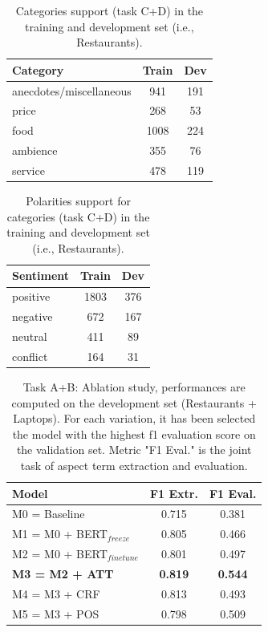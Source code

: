 \documentclass[11pt,a4paper]{article}
\begin{document}
	\begin{table}[H]
		\centering
		\begin{tabular}{@{}lcc@{}}
			\toprule
			\textbf{Category}         & Train     & Dev \\ \midrule
			anecdotes/miscellaneous   & 941       & 191     \\
			price                     & 268       & 53      \\
			food                      & 1008      & 224     \\
			ambience                  & 355       & 76      \\
			service                   & 478       & 119     \\ \bottomrule
		\end{tabular}
		\caption{Categories support (task C+D) in the training and development set
			(i.e., Restaurants).}
		\label{tab:cd_categories_support}
	\end{table}
	
	\begin{table}[H]
		\centering
		\begin{tabular}{@{}lcc@{}}
			\toprule
			\textbf{Sentiment} & Train & Dev \\ \midrule
			positive           & 1803  & 376 \\
			negative           & 672   & 167 \\
			neutral            & 411   & 89  \\
			conflict           & 164   & 31  \\ \bottomrule
		\end{tabular}
		\caption{Polarities support for categories (task C+D) in the training and development set (i.e., Restaurants).}
		\label{tab:cd_polarities_support}
	\end{table}
	
	
	\begin{table}[H]
		\centering
		\begin{tabular}{@{}lcc@{}}
			\toprule
			\textbf{Model}         & F1 Extr.       & F1 Eval.       \\ \midrule
			M0 = Baseline          & 0.715          & 0.381          \\
			M1 = M0 + BERT$_{freeze}$         & 0.805          & 0.466          \\
			M2 = M0 + BERT$_{finetune}$        & 0.801          & 0.497          \\
			\textbf{M3 = M2 + ATT} & \textbf{0.819} & \textbf{0.544} \\
			\midrule
			M4 = M3 + CRF          & 0.813          & 0.493          \\
			M5 = M3 + POS          & 0.798          & 0.509          \\ \bottomrule
		\end{tabular}
		\caption{Task A+B: Ablation study, performances are computed on the development set (Restaurants + Laptops). For each variation, it has been selected the model with the highest f1 evaluation score on the validation set. Metric "F1 Eval." is the joint task of aspect term extraction and evaluation.}
		\label{tab:ab_ablation}
	\end{table}
	
\end{document}
